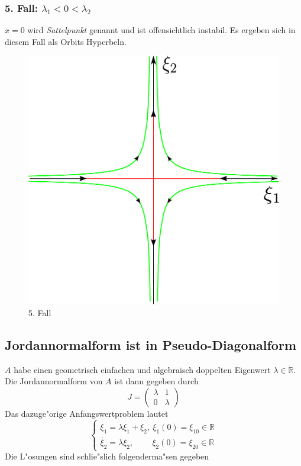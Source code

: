 \documentclass[a4paper, 13pt]{scrreprt}
\theoremstyle{definition} \newtheorem{definition}{Definition}[section]
\newcommand{\RR}{\mathbb{R}}
\begin{document}
\subsubsection{5. Fall: \(\lambda_1 < 0 < \lambda_2\)}
					\(x = 0\) wird \emph{Sattelpunkt} genannt und ist offensichtlich instabil. Es ergeben sich in diesem Fall als Orbits Hyperbeln.
		\begin{figure}[htpb]
		\centering
		\includegraphics[height=0.20\textheight]{img/lin_sys/lin_sys_5.pdf}
		\caption{5. Fall}
	\end{figure}
	
	
	
	
\subsection{Jordannormalform ist in Pseudo-Diagonalform} 
$A$ habe einen geometrisch einfachen und algebraisch doppelten Eigenwert \({\lambda \in \RR}\). Die Jordannormalform von $A$ ist dann gegeben durch
				$$ J = \left( \begin{array}{cc} \lambda & 1 \\ 0 & \lambda \end{array} \right) $$
Das dazuge"orige Anfangswertproblem lautet
				\[\begin{cases} 
					\dot{\xi_1} = \lambda \xi_1 + \xi_2,\  \xi_1(0) = \xi_{10} \in \RR \\
				 	\dot{\xi_2} = \lambda \xi_2, \qquad\  \xi_2(0) = \xi_{20} \in \RR
				\end{cases} \]
Die L"osungen sind schlie"slich folgenderma"sen gegeben
\end{document}
